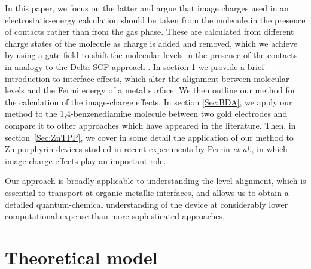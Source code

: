 \documentclass[aip,jcp,a4paper,reprint,floatfix,superscriptaddress]{revtex4-1}
\newcommand{\etal}{\emph{et al.}\xspace}
\begin{document}
In this paper, we focus on the latter and argue that image charges used in an electrostatic-energy calculation should be taken from the molecule in the presence of contacts rather than from the gas phase. These are calculated from different charge states of the molecule as charge is added and removed, which we achieve by using a gate field to shift the molecular levels in the presence of the contacts in analogy to the Delta-SCF approach \cite{Jones1989}.
In section \ref{models} we provide a brief introduction to interface effects, which alter the alignment between molecular levels and the Fermi energy of a metal surface. We then outline our method for the calculation of the image-charge effects.
In section \ref{Sec:BDA}, we apply our method to the 1,4-benzenediamine molecule between two gold electrodes and compare it to other approaches which have appeared in the literature\cite{Quek2007,Kaasbjerg2008,Mowbray2008}. Then, in section~\ref{Sec:ZnTPP}, we cover in some detail the application of our method to Zn-porphyrin devices studied in recent experiments by Perrin \etal \cite{Perrin2013}, in which image-charge effects play an important role.

Our approach is broadly applicable to understanding the level alignment, which is essential to transport at organic-metallic interfaces, and allows us to obtain a detailed quantum-chemical understanding of the device at considerably lower computational expense than more sophisticated approaches.




\section{Theoretical model}\label{models}
\end{document}
